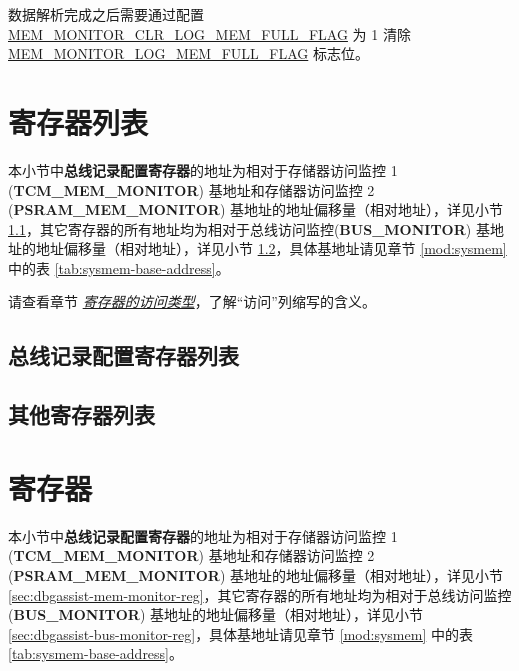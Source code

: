 \documentclass[main\_\_CN.tex]{subfiles}
\begin{document}
数据解析完成之后需要通过配置 \hyperref[fielddesc:MEMMONITORCLRLOGMEMFULLFLAG]{MEM\_MONITOR\_CLR\_LOG\_MEM\_FULL\_FLAG} 为 1 清除 \hyperref[fielddesc:MEMMONITORLOGMEMFULLFLAG]{MEM\_MONITOR\_LOG\_MEM\_FULL\_FLAG} 标志位。



\newpage
\begin{landscape}
\hypertarget{dbgassist-reg-summ}{}
\section{寄存器列表}
\label{sec:dbgassist-reg-summ}

本小节中\textbf{总线记录配置寄存器}的地址为相对于存储器访问监控 1 (\textbf{TCM\_MEM\_MONITOR}) 基地址和存储器访问监控 2 (\textbf{PSRAM\_MEM\_MONITOR}) 基地址的地址偏移量（相对地址），详见小节 \ref{sec:dbgassist-mem-monitor-reg-summ}，其它寄存器的所有地址均为相对于总线访问监控(\textbf{BUS\_MONITOR}) 基地址的地址偏移量（相对地址），详见小节 \ref{sec:dbgassist-bus-monitor-reg-summ}，具体基地址请见章节 \ref{mod:sysmem} \textit{} 中的表 \ref{tab:sysmem-base-address}。

请查看章节 \hyperref[glossary-access-types]{\textit{寄存器的访问类型}}，了解“访问”列缩写的含义。

\subsection{总线记录配置寄存器列表}
\label{sec:dbgassist-mem-monitor-reg-summ}



\subsection{其他寄存器列表}
\label{sec:dbgassist-bus-monitor-reg-summ}


\end{landscape}


\newpage
\section{寄存器}

本小节中\textbf{总线记录配置寄存器}的地址为相对于存储器访问监控 1 (\textbf{TCM\_MEM\_MONITOR}) 基地址和存储器访问监控 2 (\textbf{PSRAM\_MEM\_MONITOR}) 基地址的地址偏移量（相对地址），详见小节 \ref{sec:dbgassist-mem-monitor-reg}，其它寄存器的所有地址均为相对于总线访问监控(\textbf{BUS\_MONITOR}) 基地址的地址偏移量（相对地址），详见小节 \ref{sec:dbgassist-bus-monitor-reg}，具体基地址请见章节 \ref{mod:sysmem} \textit{} 中的表 \ref{tab:sysmem-base-address}。
\end{document}
